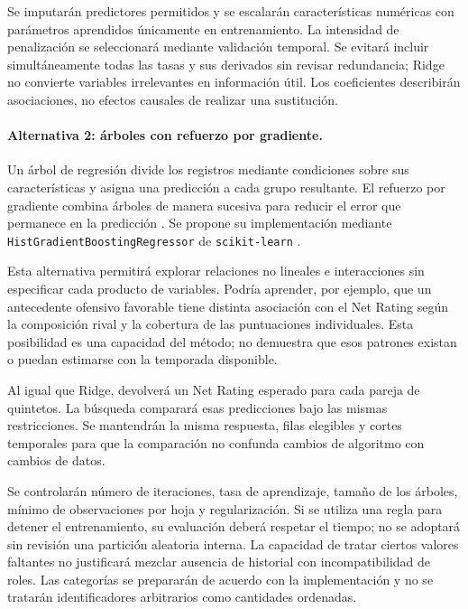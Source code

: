 Se imputarán predictores permitidos y se escalarán características numéricas con parámetros aprendidos únicamente en entrenamiento. La intensidad de penalización se seleccionará mediante validación temporal. Se evitará incluir simultáneamente todas las tasas y sus derivados sin revisar redundancia; Ridge no convierte variables irrelevantes en información útil. Los coeficientes describirán asociaciones, no efectos causales de realizar una sustitución.

\paragraph*{Alternativa 2: árboles con refuerzo por gradiente.}
Un árbol de regresión divide los registros mediante condiciones sobre sus características y asigna una predicción a cada grupo resultante. El refuerzo por gradiente combina árboles de manera sucesiva para reducir el error que permanece en la predicción \cite{friedman2001greedy}. Se propone su implementación mediante \texttt{HistGradient}\allowbreak\texttt{BoostingRegressor} de \texttt{scikit-learn} \cite{sklearnHGB616}.

Esta alternativa permitirá explorar relaciones no lineales e interacciones sin especificar cada producto de variables. Podría aprender, por ejemplo, que un antecedente ofensivo favorable tiene distinta asociación con el Net Rating según la composición rival y la cobertura de las puntuaciones individuales. Esta posibilidad es una capacidad del método; no demuestra que esos patrones existan o puedan estimarse con la temporada disponible.

Al igual que Ridge, devolverá un Net Rating esperado para cada pareja de quintetos. La búsqueda comparará esas predicciones bajo las mismas restricciones. Se mantendrán la misma respuesta, filas elegibles y cortes temporales para que la comparación no confunda cambios de algoritmo con cambios de datos.

Se controlarán número de iteraciones, tasa de aprendizaje, tamaño de los árboles, mínimo de observaciones por hoja y regularización. Si se utiliza una regla para detener el entrenamiento, su evaluación deberá respetar el tiempo; no se adoptará sin revisión una partición aleatoria interna. La capacidad de tratar ciertos valores faltantes no justificará mezclar ausencia de historial con incompatibilidad de roles. Las categorías se prepararán de acuerdo con la implementación y no se tratarán identificadores arbitrarios como cantidades ordenadas.

